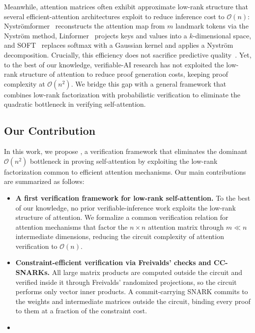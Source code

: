 Meanwhile, attention matrices often exhibit approximate low-rank structure that several efficient-attention architectures exploit to reduce inference cost to $\mathcal{O}(n)$: Nystr\"{o}mformer~\cite{Nystromformer} reconstructs the attention map from $m$ landmark tokens via the Nystr\"{o}m method, Linformer~\cite{Linformer} projects keys and values into a $k$-dimensional space, and SOFT~\cite{SOFT} replaces softmax with a Gaussian kernel and applies a Nystr\"{o}m decomposition. Crucially, this efficiency does not sacrifice predictive quality~\cite{Nystromformer,Linformer}. Yet, to the best of our knowledge, verifiable-AI research has not exploited the low-rank structure of attention to reduce proof generation costs, keeping proof complexity at $\mathcal{O}(n^2)$. We bridge this gap with a general framework that combines low-rank factorization with probabilistic verification to eliminate the quadratic bottleneck in verifying self-attention.

\subsection{Our Contribution}
In this work, we propose \name, a verification framework that eliminates the dominant $\mathcal{O}(n^2)$ bottleneck in proving self-attention by exploiting the low-rank factorization common to efficient attention mechanisms. Our main contributions are summarized as follows:
\begin{itemize}
    \item \textbf{A first verification framework for low-rank self-attention.} To the best of our knowledge, no prior verifiable-inference work exploits the low-rank structure of attention. We formalize a common verification relation for attention mechanisms that factor the $n \times n$ attention matrix through $m \ll n$ intermediate dimensions, reducing the circuit complexity of attention verification to $\mathcal{O}(n)$.
    \item \textbf{Constraint-efficient verification via Freivalds' checks and CC-SNARKs.} All large matrix products are computed outside the circuit and verified inside it through Freivalds' randomized projections, so the circuit performs only vector inner products. A commit-carrying SNARK commits to the weights and intermediate matrices outside the circuit, binding every proof to them at a fraction of the constraint cost.
    \item {}
\end{itemize}
